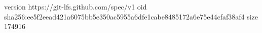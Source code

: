 version https://git-lfs.github.com/spec/v1
oid sha256:ee5f2eead421a6075bb5e350ac5955a6dfe1cabe8485172a6e75e44cfaf38af4
size 174916
